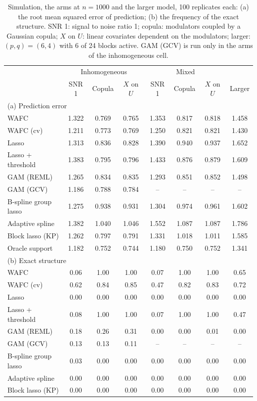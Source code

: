 \begin{table}[tp]
\caption{Simulation, the arms at $n = 1000$ and the larger model, 100 replicates each: (a) the root mean squared error of prediction; (b) the frequency of the exact structure. SNR 1: signal to noise ratio 1; copula: modulators coupled by a Gaussian copula; $X$ on $U$: linear covariates dependent on the modulators; larger: $(p,q) = (6,4)$ with 6 of 24 blocks active. GAM (GCV) is run only in the arms of the inhomogeneous cell.}
\label{tab:sim-arms}
\centering
\footnotesize
\setlength{\tabcolsep}{4pt}
\begin{tabular}{lccccccc}
\hline
 & \multicolumn{3}{c}{Inhomogeneous} & \multicolumn{3}{c}{Mixed} & \\
 & SNR 1 & Copula & $X$ on $U$ & SNR 1 & Copula & $X$ on $U$ & Larger \\
\hline
\multicolumn{8}{l}{(a) Prediction error} \\
WAFC & 1.322 & 0.769 & 0.765 & 1.353 & 0.817 & 0.818 & 1.458 \\
WAFC (cv) & 1.211 & 0.773 & 0.769 & 1.250 & 0.821 & 0.821 & 1.430 \\
Lasso & 1.313 & 0.836 & 0.828 & 1.390 & 0.940 & 0.937 & 1.652 \\
Lasso + threshold & 1.383 & 0.795 & 0.796 & 1.433 & 0.876 & 0.879 & 1.609 \\
GAM (REML) & 1.265 & 0.834 & 0.835 & 1.293 & 0.851 & 0.852 & 1.498 \\
GAM (GCV) & 1.186 & 0.788 & 0.784 & -- & -- & -- & -- \\
B-spline group lasso & 1.275 & 0.938 & 0.931 & 1.304 & 0.974 & 0.961 & 1.602 \\
Adaptive spline & 1.382 & 1.040 & 1.046 & 1.552 & 1.087 & 1.087 & 1.786 \\
Block lasso (KP) & 1.262 & 0.797 & 0.791 & 1.331 & 1.018 & 1.011 & 1.585 \\
Oracle support & 1.182 & 0.752 & 0.744 & 1.180 & 0.750 & 0.752 & 1.341 \\
\hline
\multicolumn{8}{l}{(b) Exact structure} \\
WAFC & 0.06 & 1.00 & 1.00 & 0.07 & 1.00 & 1.00 & 0.65 \\
WAFC (cv) & 0.62 & 0.84 & 0.85 & 0.47 & 0.82 & 0.83 & 0.72 \\
Lasso & 0.00 & 0.00 & 0.00 & 0.00 & 0.00 & 0.00 & 0.00 \\
Lasso + threshold & 0.08 & 1.00 & 1.00 & 0.07 & 1.00 & 1.00 & 0.47 \\
GAM (REML) & 0.18 & 0.26 & 0.31 & 0.00 & 0.00 & 0.01 & 0.00 \\
GAM (GCV) & 0.13 & 0.13 & 0.11 & -- & -- & -- & -- \\
B-spline group lasso & 0.03 & 0.00 & 0.00 & 0.00 & 0.00 & 0.00 & 0.00 \\
Adaptive spline & 0.00 & 0.00 & 0.00 & 0.00 & 0.00 & 0.00 & 0.00 \\
Block lasso (KP) & 0.00 & 0.00 & 0.00 & 0.00 & 0.00 & 0.00 & 0.00 \\
\hline
\end{tabular}
\end{table}

